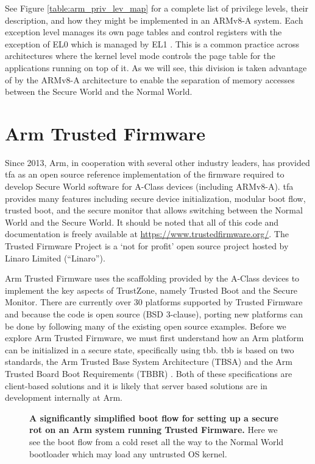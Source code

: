 \renewcommand{\arraystretch}{2.5}


See Figure \ref{table:arm_priv_lev_map} for a complete list of privilege levels, their description, and how they might be implemented in an ARMv8-A system. Each exception level manages its own page tables and control registers with the exception of EL0 which is managed by EL1 \cite{armfundv8A}. This is a common practice across architectures where the kernel level mode controls the page table for the applications running on top of it. As we will see, this division is taken advantage of by the ARMv8-A architecture to enable the separation of memory accesses between the Secure World and the Normal World.

\section{Arm Trusted Firmware}
Since 2013, Arm, in cooperation with several other industry leaders, has provided \gls{tfa} as an open source reference implementation of the firmware required to develop Secure World software for A-Class devices (including ARMv8-A). \gls{tfa} provides many features including secure device initialization, modular boot flow, trusted boot, and the secure monitor that allows switching between the Normal World and the Secure World. It should be noted that all of this code and documentation is freely available at \url{https://www.trustedfirmware.org/}. The Trusted Firmware Project is a `not for profit' open source project hosted by Linaro Limited (``Linaro'').

Arm Trusted Firmware uses the scaffolding provided by the A-Class devices to implement the key aspects of TrustZone, namely Trusted Boot and the Secure Monitor. There are currently over 30 platforms supported by Trusted Firmware and because the code is open source (BSD 3-clause), porting new platforms can be done by following many of the existing open source examples. Before we explore Arm Trusted Firmware, we must first understand how an Arm platform can be initialized in a secure state, specifically using \gls{tbb}. \gls{tbb} is based on two standards, the Arm Trusted Base System Architecture (TBSA) \cite{Edition2018} and the Arm Trusted Board Boot Requirements (TBBR) \cite{ArmTrustedBoot}. Both of these specifications are client-based solutions and it is likely that server based solutions are in development internally at Arm.

\begin{figure}[ht]
\centering

\caption[Arm's Trusted Board Boot]{\textbf{A significantly simplified boot flow for setting up a secure \gls{rot} on an Arm system running Trusted Firmware.} Here we see the boot flow from a cold reset all the way to the Normal World bootloader which may load any untrusted OS kernel.}
\label{fig:tbb-flow}
\end{figure}

